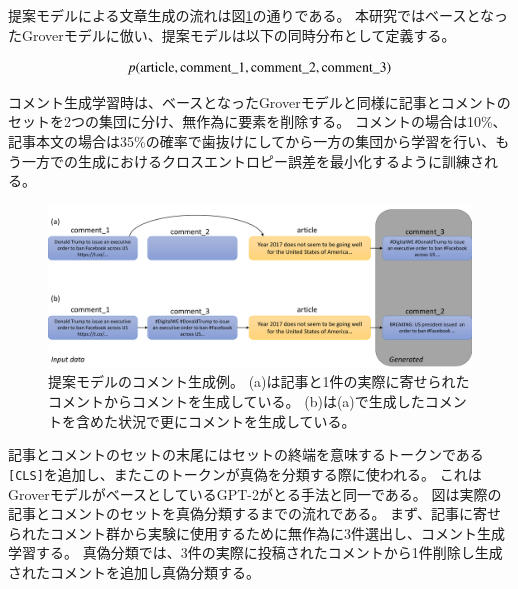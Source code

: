 \documentclass[twocolumn, a4paper, uplatex]{UECIEresume}
\begin{document}
提案モデルによる文章生成の流れは図\ref{fig:method}の通りである。
本研究ではベースとなったGroverモデル\cite{NIPS2019_9106}に倣い、提案モデルは以下の同時分布として定義する。

\begin{equation}
    \label{eq:joint_distri}
    p(\rm{article}, \rm{comment\_1}, \rm{comment\_2}, \rm{comment\_3})
\end{equation}

コメント生成学習時は、ベースとなったGroverモデルと同様に記事とコメントのセットを2つの集団に分け、無作為に要素を削除する。
コメントの場合は10\%、記事本文の場合は35\%の確率で歯抜けにしてから一方の集団から学習を行い、もう一方での生成におけるクロスエントロピー誤差を最小化するように訓練される\cite{NIPS2019_9106}。

\begin{figure}[t]
    \centering
    \includegraphics[width=\linewidth,pagebox=cropbox,clip]{images/fig_method.pdf}
    \caption{
        提案モデルのコメント生成例。
        (a)は記事と1件の実際に寄せられたコメントからコメントを生成している。
        (b)は(a)で生成したコメントを含めた状況で更にコメントを生成している。
    }
    \label{fig:method}
\end{figure}

記事とコメントのセットの末尾にはセットの終端を意味するトークンである\texttt{[CLS]}を追加し、またこのトークンが真偽を分類する際に使われる。
これはGroverモデルがベースとしているGPT-2がとる手法\cite{Radford_GPT2}と同一である。
図\label{fig:process}は実際の記事とコメントのセットを真偽分類するまでの流れである。
まず、記事に寄せられたコメント群から実験に使用するために無作為に3件選出し、コメント生成学習する。
真偽分類では、3件の実際に投稿されたコメントから1件削除し生成されたコメントを追加し真偽分類する。
\end{document}
